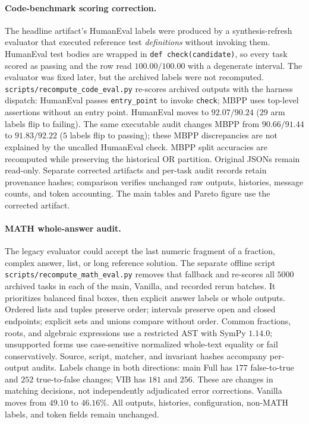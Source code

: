 \documentclass[11pt,twoside,twocolumn,letterpaper]{article}
\begin{document}
\paragraph{Code-benchmark scoring correction.} The headline artifact's HumanEval labels were produced by a synthesis-refresh evaluator that executed reference test \emph{definitions} without invoking them. HumanEval test bodies are wrapped in \texttt{def check(candidate)}, so every task scored as passing and the row read $100.00/100.00$ with a degenerate interval. The evaluator was fixed later, but the archived labels were not recomputed. \texttt{scripts/recompute\_code\_eval.py} re-scores archived outputs with the harness dispatch: HumanEval passes \texttt{entry\_point} to invoke \texttt{check}; MBPP uses top-level assertions without an entry point. HumanEval moves to $92.07/90.24$ ($29$ arm labels flip to failing). The same executable audit changes MBPP from $90.66/91.44$ to $91.83/92.22$ ($5$ labels flip to passing); these MBPP discrepancies are not explained by the uncalled HumanEval check. MBPP split accuracies are recomputed while preserving the historical OR partition. Original JSONs remain read-only. Separate corrected artifacts and per-task audit records retain provenance hashes; comparison verifies unchanged raw outputs, histories, message counts, and token accounting. The main tables and Pareto figure use the corrected artifact.

\paragraph{MATH whole-answer audit.} The legacy evaluator could accept the last numeric fragment of a fraction, complex answer, list, or long reference solution. The separate offline script \texttt{scripts/recompute\_math\_eval.py} removes that fallback and re-scores all $5000$ archived tasks in each of the main, Vanilla, and recorded rerun batches. It prioritizes balanced final boxes, then explicit answer labels or whole outputs. Ordered lists and tuples preserve order; intervals preserve open and closed endpoints; explicit sets and unions compare without order. Common fractions, roots, and algebraic expressions use a restricted AST with SymPy $1.14.0$; unsupported forms use case-sensitive normalized whole-text equality or fail conservatively. Source, script, matcher, and invariant hashes accompany per-output audits. Labels change in both directions: main Full has $177$ false-to-true and $252$ true-to-false changes; VIB has $181$ and $256$. These are changes in matching decisions, not independently adjudicated error corrections. Vanilla moves from $49.10$ to $46.16\%$. All outputs, histories, configuration, non-MATH labels, and token fields remain unchanged.
\end{document}
